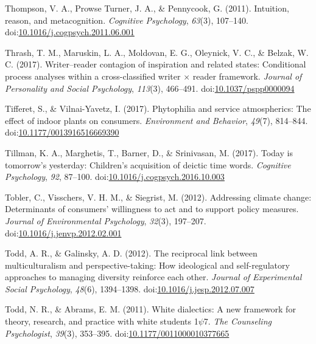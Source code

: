 \documentclass[english,man]{apa6}
\begin{document}
\hypertarget{ref-Thompson2011a}{}
Thompson, V. A., Prowse Turner, J. A., \& Pennycook, G. (2011).
Intuition, reason, and metacognition. \emph{Cognitive Psychology},
\emph{63}(3), 107--140.
doi:\href{https://doi.org/10.1016/j.cogpsych.2011.06.001}{10.1016/j.cogpsych.2011.06.001}

\hypertarget{ref-Thrash2017}{}
Thrash, T. M., Maruskin, L. A., Moldovan, E. G., Oleynick, V. C., \&
Belzak, W. C. (2017). Writer--reader contagion of inspiration and
related states: Conditional process analyses within a cross-classified
writer × reader framework. \emph{Journal of Personality and Social
Psychology}, \emph{113}(3), 466--491.
doi:\href{https://doi.org/10.1037/pspp0000094}{10.1037/pspp0000094}

\hypertarget{ref-Tifferet2017}{}
Tifferet, S., \& Vilnai-Yavetz, I. (2017). Phytophilia and service
atmospherics: The effect of indoor plants on consumers.
\emph{Environment and Behavior}, \emph{49}(7), 814--844.
doi:\href{https://doi.org/10.1177/0013916516669390}{10.1177/0013916516669390}

\hypertarget{ref-Tillman2017}{}
Tillman, K. A., Marghetis, T., Barner, D., \& Srinivasan, M. (2017).
Today is tomorrow's yesterday: Children's acquisition of deictic time
words. \emph{Cognitive Psychology}, \emph{92}, 87--100.
doi:\href{https://doi.org/10.1016/j.cogpsych.2016.10.003}{10.1016/j.cogpsych.2016.10.003}

\hypertarget{ref-Tobler2012}{}
Tobler, C., Visschers, V. H. M., \& Siegrist, M. (2012). Addressing
climate change: Determinants of consumers' willingness to act and to
support policy measures. \emph{Journal of Environmental Psychology},
\emph{32}(3), 197--207.
doi:\href{https://doi.org/10.1016/j.jenvp.2012.02.001}{10.1016/j.jenvp.2012.02.001}

\hypertarget{ref-Todd2012}{}
Todd, A. R., \& Galinsky, A. D. (2012). The reciprocal link between
multiculturalism and perspective-taking: How ideological and
self-regulatory approaches to managing diversity reinforce each other.
\emph{Journal of Experimental Social Psychology}, \emph{48}(6),
1394--1398.
doi:\href{https://doi.org/10.1016/j.jesp.2012.07.007}{10.1016/j.jesp.2012.07.007}

\hypertarget{ref-Todd2011a}{}
Todd, N. R., \& Abrams, E. M. (2011). White dialectics: A new framework
for theory, research, and practice with white students 1\(\psi\)7.
\emph{The Counseling Psychologist}, \emph{39}(3), 353--395.
doi:\href{https://doi.org/10.1177/0011000010377665}{10.1177/0011000010377665}
\end{document}
